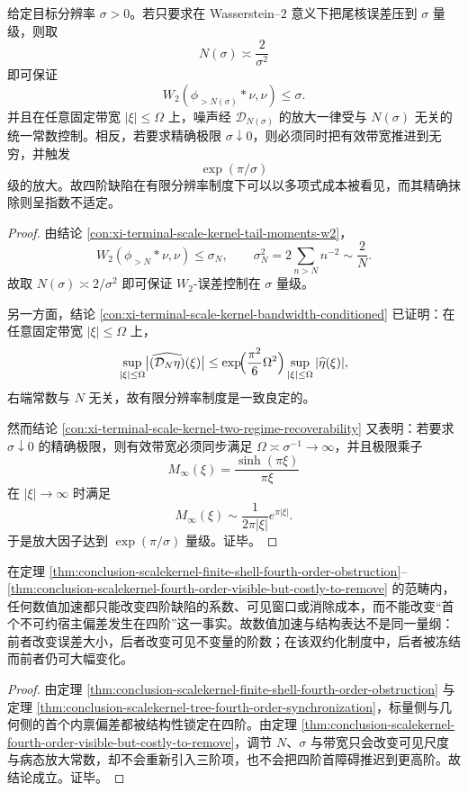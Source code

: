\begin{theorem}[四阶缺陷的低成本可见与高成本消除]\label{thm:conclusion-scalekernel-fourth-order-visible-but-costly-to-remove}
给定目标分辨率 \(\sigma>0\)。若只要求在 Wasserstein--\(2\) 意义下把尾核误差压到 \(\sigma\) 量级，则取
\[
N(\sigma)\asymp \frac{2}{\sigma^2}
\]
即可保证
\[
W_2(\phi_{>N(\sigma)}*\nu,\nu)\le \sigma.
\]
并且在任意固定带宽 \(|\xi|\le \Omega\) 上，噪声经 \(\mathcal D_{N(\sigma)}\) 的放大一律受与 \(N(\sigma)\) 无关的统一常数控制。相反，若要求精确极限 \(\sigma\downarrow 0\)，则必须同时把有效带宽推进到无穷，并触发
\[
\exp(\pi/\sigma)
\]
级的放大。故四阶缺陷在有限分辨率制度下可以以多项式成本被看见，而其精确抹除则呈指数不适定。
\end{theorem}
\begin{proof}
由结论 \ref{con:xi-terminal-scale-kernel-tail-moments-w2}，
\[
W_2(\phi_{>N}*\nu,\nu)\le \sigma_N,
\qquad
\sigma_N^2=2\sum_{n>N}n^{-2}\sim \frac{2}{N}.
\]
故取 \(N(\sigma)\asymp 2/\sigma^2\) 即可保证 \(W_2\)-误差控制在 \(\sigma\) 量级。

另一方面，结论 \ref{con:xi-terminal-scale-kernel-bandwidth-conditioned} 已证明：在任意固定带宽 \(|\xi|\le \Omega\) 上，
\[
\sup_{|\xi|\le \Omega}\bigl|\widehat{(\mathcal D_N\eta)}(\xi)\bigr|
\le
\exp\!\Bigl(\frac{\pi^2}{6}\Omega^2\Bigr)\sup_{|\xi|\le \Omega}|\widehat\eta(\xi)|,
\]
右端常数与 \(N\) 无关，故有限分辨率制度是一致良定的。

然而结论 \ref{con:xi-terminal-scale-kernel-two-regime-recoverability} 又表明：若要求 \(\sigma\downarrow 0\) 的精确极限，则有效带宽必须同步满足 \(\Omega\asymp \sigma^{-1}\to\infty\)，并且极限乘子
\[
M_\infty(\xi)=\frac{\sinh(\pi\xi)}{\pi\xi}
\]
在 \(|\xi|\to\infty\) 时满足
\[
M_\infty(\xi)\sim \frac{1}{2\pi|\xi|}e^{\pi|\xi|}.
\]
于是放大因子达到 \(\exp(\pi/\sigma)\) 量级。证毕。
\end{proof}

\begin{corollary}[数值加速与结构表达的正交性]\label{cor:conclusion-scalekernel-tree-numerics-vs-structure-orthogonality}
在定理 \ref{thm:conclusion-scalekernel-finite-shell-fourth-order-obstruction}--\ref{thm:conclusion-scalekernel-fourth-order-visible-but-costly-to-remove} 的范畴内，任何数值加速都只能改变四阶缺陷的系数、可见窗口或消除成本，而不能改变“首个不可约宿主偏差发生在四阶”这一事实。故数值加速与结构表达不是同一量纲：前者改变误差大小，后者改变可见不变量的阶数；在该双约化制度中，后者被冻结而前者仍可大幅变化。
\end{corollary}
\begin{proof}
由定理 \ref{thm:conclusion-scalekernel-finite-shell-fourth-order-obstruction} 与定理 \ref{thm:conclusion-scalekernel-tree-fourth-order-synchronization}，标量侧与几何侧的首个内禀偏差都被结构性锁定在四阶。由定理 \ref{thm:conclusion-scalekernel-fourth-order-visible-but-costly-to-remove}，调节 \(N\)、\(\sigma\) 与带宽只会改变可见尺度与病态放大常数，却不会重新引入三阶项，也不会把四阶首障碍推迟到更高阶。故结论成立。证毕。
\end{proof}

